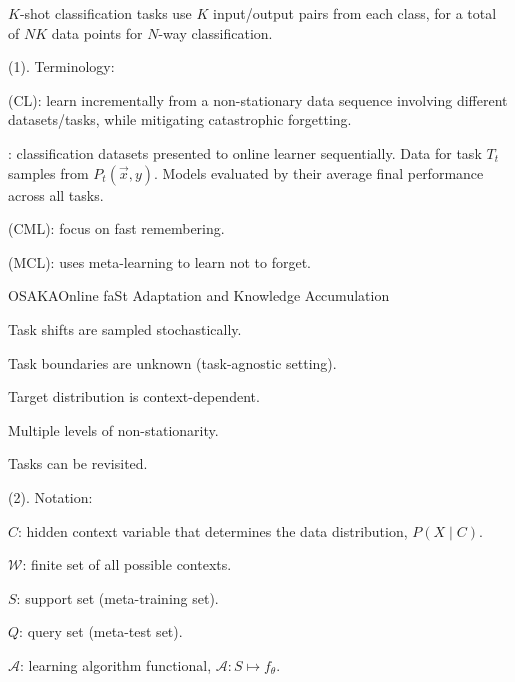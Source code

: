 \documentclass[11pt]{article}
\begin{document}
$K$-shot classification tasks use $K$ input/output pairs from each class, for a total of $NK$ data points for $N$-way classification. 







 (1). Terminology:
\begin{compactitem}
	\item {} (CL): learn incrementally from a non-stationary data sequence involving different datasets/tasks, while mitigating catastrophic forgetting.
	\begin{compactitem}
		\item {}: classification datasets presented to online learner sequentially. Data for task $T_t$ samples from $P_t(\vec x, y)$. Models evaluated by their average final performance across all tasks. 
	\end{compactitem}
	\item {} (CML): focus on fast remembering. 
	\item {} (MCL): uses meta-learning to learn not to forget. 
\end{compactitem}

\begin{itemdefinition}{OSAKA}{Online faSt Adaptation and Knowledge Accumulation}
	\item Task shifts are sampled stochastically. 
	\item Task boundaries are unknown (task-agnostic setting).
	\item Target distribution is context-dependent. 
	\item Multiple levels of non-stationarity. 
	\item Tasks can be revisited. 
\end{itemdefinition}

 (2). Notation:
\begin{compactitem}
	\item $C$: hidden context variable that determines the data distribution, $P(X \mid C)$. 
	\item $\mathcal W$: finite set of all possible contexts. 
	\item $S$: support set (meta-training set). 
	\item $Q$: query set (meta-test set). 
	\item $\mathcal A$: learning algorithm functional, $\mathcal A : S \mapsto f_{\theta}$. 
\end{compactitem}
\end{document}
